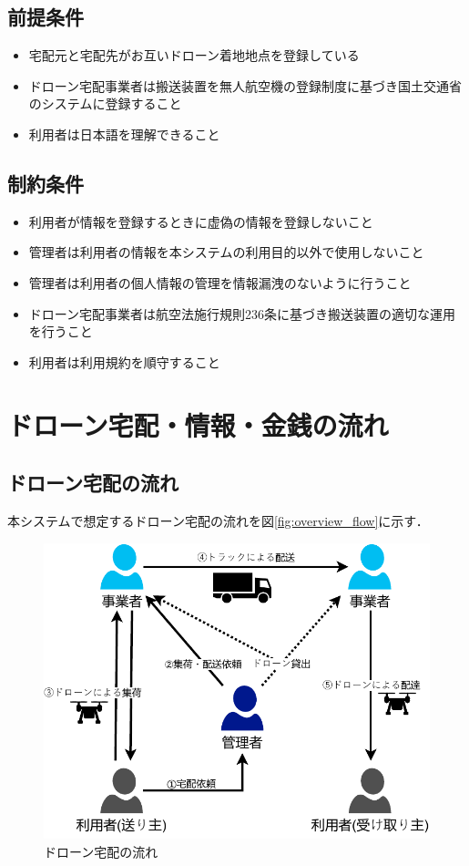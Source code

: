 \documentclass[a4paper, titlepage]{jsarticle}
\begin{document}
\subsection{前提条件}
\begin{itemize}
        \item 宅配元と宅配先がお互いドローン着地地点を登録している
        \item ドローン宅配事業者は搬送装置を無人航空機の登録制度に基づき国土交通省のシステムに登録すること
        \item 利用者は日本語を理解できること
\end{itemize}
\subsection{制約条件}
\begin{itemize}
        \item 利用者が情報を登録するときに虚偽の情報を登録しないこと
        \item 管理者は利用者の情報を本システムの利用目的以外で使用しないこと
        \item 管理者は利用者の個人情報の管理を情報漏洩のないように行うこと
        \item ドローン宅配事業者は航空法施行規則236条に基づき搬送装置の適切な運用を行うこと
        \item 利用者は利用規約を順守すること
\end{itemize}
\section{ドローン宅配・情報・金銭の流れ}

\subsection{ドローン宅配の流れ}
本システムで想定するドローン宅配の流れを図\ref{fig:overview_flow}に示す．

\begin{figure}[H]
  \centering
  \includegraphics[width=0.6\linewidth]{./overview_flow.pdf}
  \caption{ドローン宅配の流れ}
  \label{fig:overview_flow_1}
\end{figure}
\end{document}
